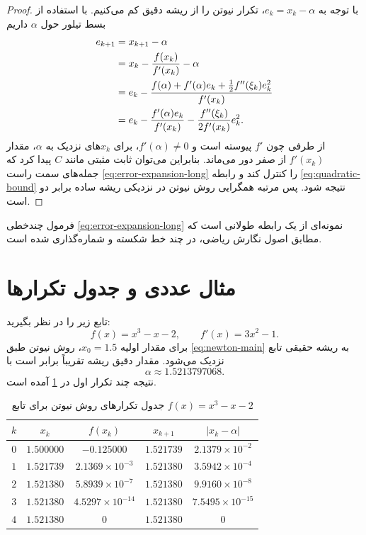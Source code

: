 \begin{proof}
با توجه به $e_k=x_k-\alpha$، تکرار نیوتن را از ریشه دقیق کم می‌کنیم. با استفاده از بسط تیلور حول $\alpha$ داریم
\begin{align}
 e_{k+1}
 &=x_{k+1}-\alpha \notag\\
 &=x_k-\frac{f(x_k)}{f'(x_k)}-\alpha \notag\\
 &=e_k-\frac{f(\alpha)+f'(\alpha)e_k+\frac{1}{2}f''(\xi_k)e_k^2}{f'(x_k)} \notag\\
 &=e_k-\frac{f'(\alpha)e_k}{f'(x_k)}-
 \frac{f''(\xi_k)}{2f'(x_k)}e_k^2 .
 \label{eq:error-expansion-long}
\end{align}
از طرفی چون $f'$ پیوسته است و $f'(\alpha)\neq 0$، برای $x_k$های نزدیک به $\alpha$، مقدار $f'(x_k)$ از صفر دور می‌ماند. بنابراین می‌توان ثابت مثبتی مانند $C$ پیدا کرد که جمله‌های سمت راست \cref{eq:error-expansion-long} را کنترل کند و رابطه \cref{eq:quadratic-bound} نتیجه شود. پس مرتبه همگرایی روش نیوتن در نزدیکی ریشه ساده برابر دو است.
\end{proof}

فرمول چندخطی \cref{eq:error-expansion-long} نمونه‌ای از یک رابطه طولانی است که مطابق اصول نگارش ریاضی، در چند خط شکسته و شماره‌گذاری شده است.

\section{مثال عددی و جدول تکرارها}
تابع زیر را در نظر بگیرید:
\begin{equation}
 f(x)=x^3-x-2,
 \qquad
 f'(x)=3x^2-1.
 \label{eq:example-function}
\end{equation}
برای مقدار اولیه $x_0=1.5$، روش نیوتن طبق \cref{eq:newton-main} به ریشه حقیقی تابع نزدیک می‌شود. مقدار دقیق ریشه تقریباً برابر است با
\begin{equation}
 \alpha\approx 1.5213797068.
 \label{eq:alpha-value}
\end{equation}
نتیجه چند تکرار اول در \cref{tab:newton-table} آمده است.

\begin{table}[H]
\centering
\caption{جدول تکرارهای روش نیوتن برای تابع $f(x)=x^3-x-2$}
\label{tab:newton-table}
\begin{tabular}{|c|c|c|c|c|}
\hline
$k$ & $x_k$ & $f(x_k)$ & $x_{k+1}$ & $|x_k-\alpha|$ \\
\hline
$0$ & $1.500000$ & $-0.125000$ & $1.521739$ & $2.1379\times10^{-2}$ \\
\hline
$1$ & $1.521739$ & $2.1369\times10^{-3}$ & $1.521380$ & $3.5942\times10^{-4}$ \\
\hline
$2$ & $1.521380$ & $5.8939\times10^{-7}$ & $1.521380$ & $9.9160\times10^{-8}$ \\
\hline
$3$ & $1.521380$ & $4.5297\times10^{-14}$ & $1.521380$ & $7.5495\times10^{-15}$ \\
\hline
$4$ & $1.521380$ & $0$ & $1.521380$ & $0$ \\
\hline
\end{tabular}
\end{table}


